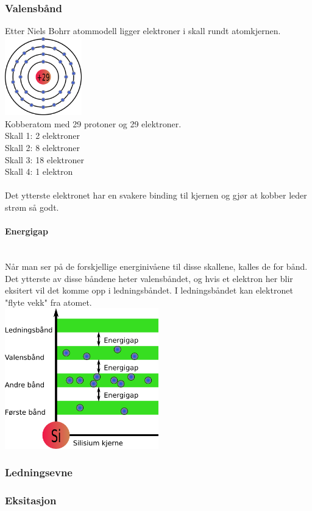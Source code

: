 \subsubsection{Valensbånd}
Etter Niels Bohrr atommodell ligger elektroner i skall rundt atomkjernen.
\\
\includegraphics[width=0.25\textwidth]{./img/bohr-Cu}
\\
Kobberatom med 29 protoner og 29 elektroner.\\
Skall 1: 2 elektroner \\
Skall 2: 8 elektroner \\
Skall 3: 18 elektroner \\
Skall 4: 1 elektron
\\\\
Det ytterste elektronet har en svakere binding til kjernen og gjør at kobber leder strøm så godt.

\paragraph{Energigap} \mbox{} \\
Når man ser på de forskjellige energinivåene til disse skallene,
kalles de for bånd.
Det ytterste av disse båndene heter valensbåndet,
og hvis et elektron her blir eksitert vil det komme opp i ledningsbåndet.
I ledningsbåndet kan elektronet "flyte vekk" fra atomet.
\\
\includegraphics[width=0.5\textwidth]{./img/valence-Cu}



\subsubsection{Ledningsevne}




\subsubsection{Eksitasjon}

